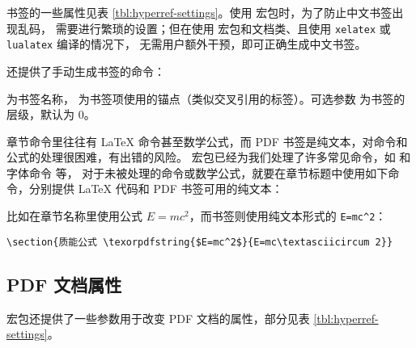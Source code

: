书签的一些属性见表 \ref{tbl:hyperref-settings}。使用  宏包时，为了防止中文书签出现乱码，
需要进行繁琐的设置；但在使用  宏包和文档类、且使用 \texttt{xelatex} 或 \texttt{lualatex} 编译的情况下，
无需用户额外干预，即可正确生成中文书签。

 还提供了手动生成书签的命令：
\begin{command}
\end{command}
 为书签名称， 为书签项使用的锚点（类似交叉引用的标签）。可选参数  为书签的层级，默认为 0。

章节命令里往往有 \LaTeX{} 命令甚至数学公式，而 PDF 书签是纯文本，对命令和公式的处理很困难，有出错的风险。
 宏包已经为我们处理了许多常见命令，如  和字体命令  等，
对于未被处理的命令或数学公式，就要在章节标题中使用如下命令，分别提供 \LaTeX{} 代码和 PDF 书签可用的纯文本：
\begin{command}
\end{command}
比如在章节名称里使用公式 $E=mc^2$，而书签则使用纯文本形式的 \verb|E=mc^2|：
\begin{verbatim}
\section{质能公式 \texorpdfstring{$E=mc^2$}{E=mc\textasciicircum 2}}
\end{verbatim}

\subsection{PDF 文档属性}\label{subsec:pdf-settings}

 宏包还提供了一些参数用于改变 PDF 文档的属性，部分见表 \ref{tbl:hyperref-settings}。


\endinput
